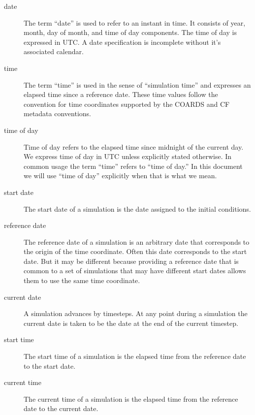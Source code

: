 \documentclass[12pt]{article}
\begin{document}
\begin{description}

\item [date] \label{term:date} 
The term ``date'' is used to refer to an instant in time.  It consists of
year, month, day of month, and time of day components.  The time of day is
expressed in UTC.  A date specification is incomplete without it's
associated calendar.

\item [time] \label{term:time}
The term ``time'' is used in the sense of ``simulation time'' and expresses
an elapsed time since a reference date.  These time values follow the
convention for time coordinates supported by the COARDS \cite{coards} and
CF \cite{cf} metadata conventions.

\item [time of day] \label{term:tod}
Time of day refers to the elapsed time since midnight of the current day.
We express time of day in UTC unless explicitly stated otherwise.  In
common usage the term ``time'' refers to ``time of day.''  In this document
we will use ``time of day'' explicitly when that is what we mean.

\item [start date] \label{term:start date}
The start date of a simulation is the date assigned to the initial conditions.

\item [reference date] \label{term:reference date}
The reference date of a simulation is an arbitrary date that corresponds to
the origin of the time coordinate.  Often this date corresponds to the
start date.  But it may be different because providing a reference date
that is common to a set of simulations that may have different start dates
allows them to use the same time coordinate.

\item [current date] \label{term:current date}
A simulation advances by timesteps.  At any point during a simulation
the current date is taken to be the date at the end of the current
timestep.

\item [start time] \label{term:start time}
The start time of a simulation is the elapsed time from the reference date to
the start date.

\item [current time] \label{term:current time}
The current time of a simulation is the elapsed time from the reference date to
the current date.


\end{description}
\end{document}
